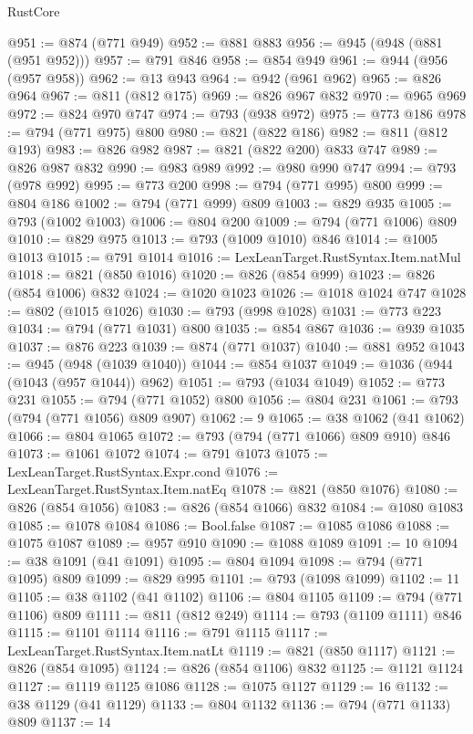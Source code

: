 \begin{lexlean}{RustCore}
\begin{coremodule}
@951 := @874 (@771 @949)
@952 := @881 @883
@956 := @945 (@948 (@881 (@951 @952)))
@957 := @791 @846
@958 := @854 @949
@961 := @944 (@956 (@957 @958))
@962 := @13 @943
@964 := @942 (@961 @962)
@965 := @826 @964
@967 := @811 (@812 @175)
@969 := @826 @967 @832
@970 := @965 @969
@972 := @824 @970 @747
@974 := @793 (@938 @972)
@975 := @773 @186
@978 := @794 (@771 @975) @800
@980 := @821 (@822 @186)
@982 := @811 (@812 @193)
@983 := @826 @982
@987 := @821 (@822 @200) @833 @747
@989 := @826 @987 @832
@990 := @983 @989
@992 := @980 @990 @747
@994 := @793 (@978 @992)
@995 := @773 @200
@998 := @794 (@771 @995) @800
@999 := @804 @186
@1002 := @794 (@771 @999) @809
@1003 := @829 @935
@1005 := @793 (@1002 @1003)
@1006 := @804 @200
@1009 := @794 (@771 @1006) @809
@1010 := @829 @975
@1013 := @793 (@1009 @1010) @846
@1014 := @1005 @1013
@1015 := @791 @1014
@1016 := LexLeanTarget.RustSyntax.Item.natMul
@1018 := @821 (@850 @1016)
@1020 := @826 (@854 @999)
@1023 := @826 (@854 @1006) @832
@1024 := @1020 @1023
@1026 := @1018 @1024 @747
@1028 := @802 (@1015 @1026)
@1030 := @793 (@998 @1028)
@1031 := @773 @223
@1034 := @794 (@771 @1031) @800
@1035 := @854 @867
@1036 := @939 @1035
@1037 := @876 @223
@1039 := @874 (@771 @1037)
@1040 := @881 @952
@1043 := @945 (@948 (@1039 @1040))
@1044 := @854 @1037
@1049 := @1036 (@944 (@1043 (@957 @1044)) @962)
@1051 := @793 (@1034 @1049)
@1052 := @773 @231
@1055 := @794 (@771 @1052) @800
@1056 := @804 @231
@1061 := @793 (@794 (@771 @1056) @809 @907)
@1062 := 9
@1065 := @38 @1062 (@41 @1062)
@1066 := @804 @1065
@1072 := @793 (@794 (@771 @1066) @809 @910) @846
@1073 := @1061 @1072
@1074 := @791 @1073
@1075 := LexLeanTarget.RustSyntax.Expr.cond
@1076 := LexLeanTarget.RustSyntax.Item.natEq
@1078 := @821 (@850 @1076)
@1080 := @826 (@854 @1056)
@1083 := @826 (@854 @1066) @832
@1084 := @1080 @1083
@1085 := @1078 @1084
@1086 := Bool.false
@1087 := @1085 @1086
@1088 := @1075 @1087
@1089 := @957 @910
@1090 := @1088 @1089
@1091 := 10
@1094 := @38 @1091 (@41 @1091)
@1095 := @804 @1094
@1098 := @794 (@771 @1095) @809
@1099 := @829 @995
@1101 := @793 (@1098 @1099)
@1102 := 11
@1105 := @38 @1102 (@41 @1102)
@1106 := @804 @1105
@1109 := @794 (@771 @1106) @809
@1111 := @811 (@812 @249)
@1114 := @793 (@1109 @1111) @846
@1115 := @1101 @1114
@1116 := @791 @1115
@1117 := LexLeanTarget.RustSyntax.Item.natLt
@1119 := @821 (@850 @1117)
@1121 := @826 (@854 @1095)
@1124 := @826 (@854 @1106) @832
@1125 := @1121 @1124
@1127 := @1119 @1125 @1086
@1128 := @1075 @1127
@1129 := 16
@1132 := @38 @1129 (@41 @1129)
@1133 := @804 @1132
@1136 := @794 (@771 @1133) @809
@1137 := 14

\end{coremodule}
\end{lexlean}

